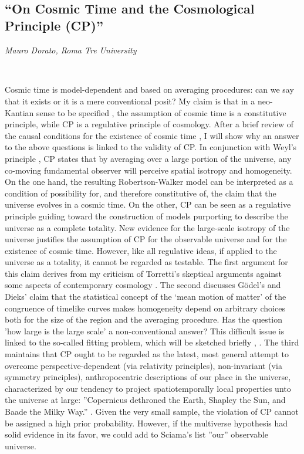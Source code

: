 \documentclass[11pt]{article}
\begin{document}
\

\subsection*{\textsf{``On Cosmic Time and the
Cosmological Principle (CP)''}}

\textcolor{moderncvgreen}{
\textit{Mauro Dorato, Roma Tre University
}
}

\

\newrefsection

Cosmic time is model-dependent and based on averaging procedures: can we say that it exists or it is a mere conventional posit? My claim is that in a neo-Kantian sense to be specified \cite{friedman1991}, the assumption of cosmic time is a constitutive principle, while CP is a regulative principle of cosmology. After a brief review of the causal conditions for the existence of cosmic time \cite{wald1984general}, I will show why an answer to the above questions is linked to the validity of CP. In conjunction with Weyl’s principle \cite{weyl1923}, CP states that by averaging over a large portion of the universe, any co-moving fundamental observer will perceive spatial isotropy and homogeneity. On the one hand, the resulting Robertson-Walker model can be interpreted as a condition of possibility for, and therefore constitutive of, the claim that the universe evolves in a cosmic time. On the other, CP can be seen as a regulative principle guiding toward the construction of models purporting to describe the universe as a complete totality. New evidence for the large-scale isotropy of the universe justifies the assumption of CP for the observable universe and for the existence of cosmic time. However, like all regulative ideas, if applied to the universe as a totality, it cannot be regarded as testable. The first argument for this claim derives from my criticism of Torretti’s skeptical arguments against some aspects of contemporary cosmology \cite{torretti2000}. The second discusses Gödel’s \cite{godel1949} and Dieks’ \cite{dieks2006} claim that the statistical concept of the ‘mean motion of matter’ of the congruence of timelike curves makes homogeneity depend on arbitrary choices both for the size of the region and the averaging procedure. Has the question ’how large is the large scale’ a non-conventional answer? This difficult issue is linked to the so-called fitting problem, which will be sketched briefly \cite{ellis1987}, \cite{smeenk2020}. The third maintains that CP ought to be regarded as the latest, most general attempt to overcome perspective-dependent (via relativity principles), non-invariant (via symmetry principles), anthropocentric descriptions of our place in the universe, characterized by our tendency to project spatiotemporally local properties unto the universe at large: ”Copernicus dethroned the Earth, Shapley the Sun, and Baade the Milky Way.” \cite{sciama1959}. Given the very small sample, the violation of CP cannot be assigned a high prior probability. However, if the multiverse hypothesis had solid evidence in its favor, we could add to Sciama’s list ”our” observable universe.

\ 

\printbibliography[heading=none]
\end{document}
